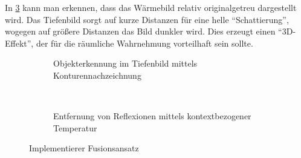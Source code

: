 In \cref{fig:fusion_fus} kann man erkennen, dass das Wärmebild relativ originalgetreu dargestellt wird.
Das Tiefenbild sorgt auf kurze Distanzen für eine helle \enquote{Schattierung}, wogegen auf größere Distanzen das Bild dunkler wird.
Dies erzeugt einen \enquote{3D-Effekt}, der für die räumliche Wahrnehmung vorteilhaft sein sollte.
\begin{figure}[H]
	\centering
	\begin{subfigure}[t]{0.45\textwidth}
		\centering
		\caption{Objekterkennung im Tiefenbild mittels Konturennachzeichnung}
		\label{fig:fusion_fus1}
	\end{subfigure}
	~
	\begin{subfigure}[t]{0.45\textwidth}
		\centering
		\caption{Entfernung von Reflexionen mittels kontextbezogener Temperatur}
		\label{fig:fusion_fus2}
	\end{subfigure}
	\caption{Implementierer Fusionsansatz}
	\label{fig:fusion_fus}
\end{figure}